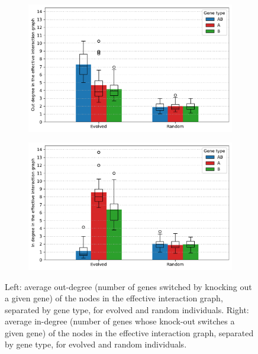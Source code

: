 \begin{figure}[H]
  \begin{subfigure}[t]{0.49\textwidth}
    \includegraphics[width=\textwidth]{ploscb/img/effective_graph_combined_out_degree.pdf}
  \end{subfigure}
  \begin{subfigure}[t]{0.49\textwidth}
    \includegraphics[width=\textwidth]{ploscb/img/effective_graph_combined_in_degree.pdf}
  \end{subfigure}
  \caption{Left: average out-degree (number of genes switched by knocking out a given gene) of the nodes in the effective interaction graph, separated by gene type, for evolved and random individuals.
  Right: average in-degree (number of genes whose knock-out switches a given gene) of the nodes in the effective interaction graph, separated by gene type, for evolved and random individuals.}
  \label{fig:ko_data}
\end{figure}

